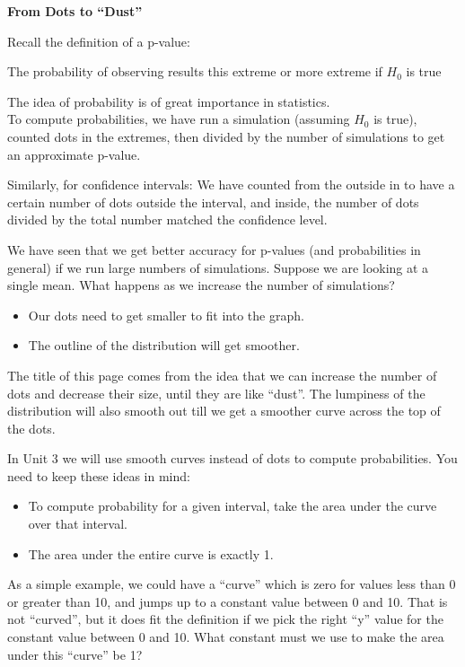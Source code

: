 \def\theTopic{Reading 17}

\begin{center}
{\bf {\large From Dots to ``Dust''}}
\end{center}


Recall the definition of a p-value:

{\sf The probability of observing results this extreme or more extreme
  if $H_0$ is true}

The idea of probability is of great importance in statistics.\\
To compute probabilities, we have run a simulation (assuming $H_0$ is
true), counted dots in the extremes, then divided by the number of
simulations to get an approximate p-value.

Similarly, for confidence intervals:  We have counted from the outside
in to have a certain number of dots outside the interval, and inside,
the number of dots divided by the total number matched the confidence
level.  


We have  seen that we get better accuracy for p-values (and
probabilities in general) if we run large numbers of simulations.
Suppose we are looking at a single mean. What happens as we increase
the number of simulations?
\begin{itemize}
  \item Our dots need to get smaller to fit into the graph.
  \item The outline of the distribution will get smoother.
\end{itemize}

The title of this page comes from the idea that we can increase the
number of dots and decrease their size, until they are like ``dust''. 
The lumpiness of the distribution will also smooth out till we get a
smoother curve across the top of the dots.

In Unit 3 we will use smooth curves instead of dots to
compute probabilities. You need to keep these ideas in mind:
\begin{itemize}
  \item To compute probability for a given interval, take the area
    under the curve over that interval.
  \item The area under the entire curve is exactly 1.
\end{itemize}


As a simple example, we could have a ``curve'' which is zero for
values less than 0 or greater than 10, and jumps up to a constant
value between 0 and 10.  That is not ``curved'', but it does fit the
definition if we pick the right ``y'' value for the constant value
between 0 and 10.  What constant must we use to make the area under
this ``curve'' be 1? 


